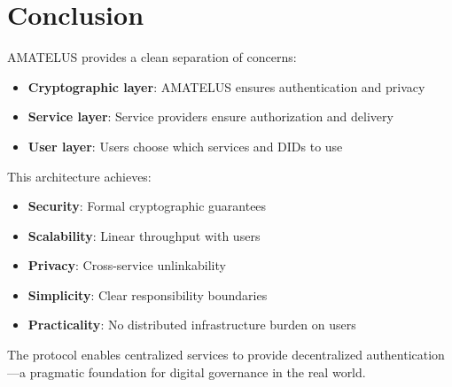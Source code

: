 \chapter{Conclusion}

AMATELUS provides a clean separation of concerns:

\begin{itemize}
  \item \textbf{Cryptographic layer}: AMATELUS ensures authentication and privacy
  \item \textbf{Service layer}: Service providers ensure authorization and delivery
  \item \textbf{User layer}: Users choose which services and DIDs to use
\end{itemize}

This architecture achieves:
\begin{itemize}
  \item \textbf{Security}: Formal cryptographic guarantees
  \item \textbf{Scalability}: Linear throughput with users
  \item \textbf{Privacy}: Cross-service unlinkability
  \item \textbf{Simplicity}: Clear responsibility boundaries
  \item \textbf{Practicality}: No distributed infrastructure burden on users
\end{itemize}

The protocol enables centralized services to provide decentralized authentication—a pragmatic foundation for digital governance in the real world.
